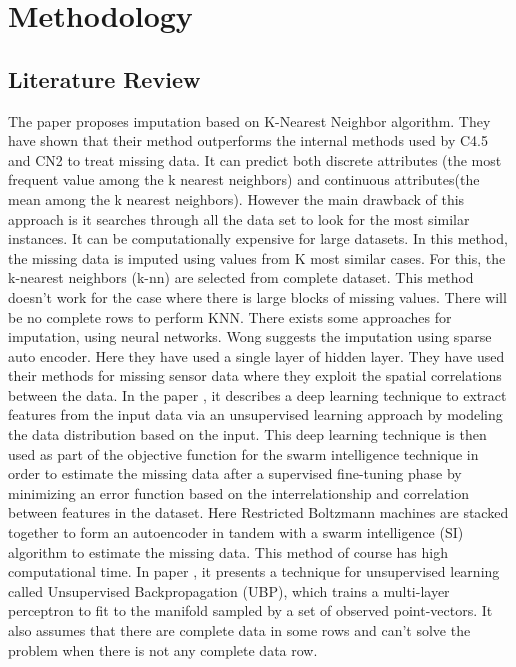 \chapter{Methodology}\label{ch:methodology}
\section{Literature Review}
The paper \cite{gustavo_knn} proposes imputation based on K-Nearest Neighbor algorithm. They have shown that their method outperforms the internal methods used by C4.5 and CN2 to treat missing data.  It can predict both discrete attributes (the most frequent value among the k nearest neighbors) and continuous attributes(the mean among the k nearest neighbors). However the main drawback of this approach is it searches through all the data set to look for the most similar instances. It can be computationally expensive for large datasets.
\newline
In this method, the  missing  data  is  imputed  using values  from  K  most  similar  cases. For this, the k-nearest neighbors (k-nn) are selected from complete dataset. This method doesn't work for the case where there is large blocks of missing values. There will be no complete rows to perform KNN.
\newline
There exists some approaches for imputation, using neural networks. 
Wong \cite{wong_sa} suggests the imputation using sparse auto encoder. Here they have used a single layer of hidden layer. They have used their methods for missing sensor data where they exploit the spatial correlations between the data. 
\newline
In the paper \cite{collins_swarm_intelligence}, it describes a deep learning technique to extract features from the input data via an unsupervised learning approach by modeling the data distribution based on the input. This deep learning technique is then used as part of the objective function for the swarm intelligence technique in order to estimate the missing data after a supervised fine-tuning phase by minimizing an error function based on the interrelationship and correlation between features in the dataset. Here Restricted Boltzmann machines are stacked together to form an autoencoder in tandem with a swarm intelligence (SI) algorithm to estimate the missing data. This method of course has high computational time.
\newline
In paper \cite{michael_ubp}, it presents a technique for unsupervised learning called Unsupervised Backpropagation (UBP), which trains a multi-layer perceptron to fit to the manifold sampled by a set of observed point-vectors. It also assumes that there are complete data in some rows and can't solve the problem when there is not any complete data row. 
